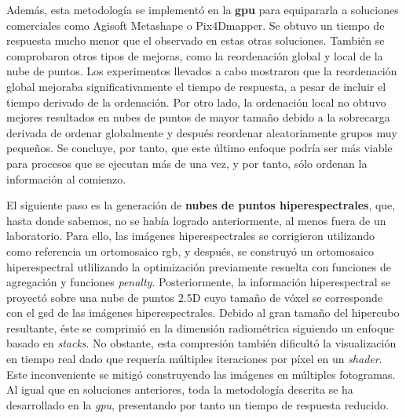 Además, esta metodología se implementó en la \textbf{\acrshort{gpu}} para equipararla a soluciones comerciales como Agisoft Metashape o Pix4Dmapper. Se obtuvo un tiempo de respuesta mucho menor que el observado en estas otras soluciones. También se comprobaron otros tipos de mejoras, como la reordenación global y local de la nube de puntos. Los experimentos llevados a cabo mostraron que la reordenación global mejoraba significativamente el tiempo de respuesta, a pesar de incluir el tiempo derivado de la ordenación. Por otro lado, la ordenación local no obtuvo mejores resultados en nubes de puntos de mayor tamaño debido a la sobrecarga derivada de ordenar globalmente y después reordenar aleatoriamente grupos muy pequeños. Se concluye, por tanto, que este último enfoque podría ser más viable para procesos que se ejecutan más de una vez, y por tanto, sólo ordenan la información al comienzo.

El siguiente paso es la generación de \textbf{nubes de puntos hiperespectrales}, que, hasta donde sabemos, no se había logrado anteriormente, al menos fuera de un laboratorio. Para ello, las imágenes hiperespectrales se corrigieron utilizando como referencia un ortomosaico \acrshort{rgb}, y después, se construyó un ortomosaico hiperespectral utlilizando la optimización previamente resuelta con funciones de agregación y funciones \textit{penalty}. Posteriormente, la información hiperespectral se proyectó sobre una nube de puntos 2.5D cuyo tamaño de vóxel se corresponde con el \acrshort{gsd} de las imágenes hiperespectrales. Debido al gran tamaño del hipercubo resultante, éste se comprimió en la dimensión radiométrica siguiendo un enfoque basado en \textit{stacks}. No obstante, esta compresión también dificultó la visualización en tiempo real dado que requería múltiples iteraciones por píxel en un \textit{shader}. Este inconveniente se mitigó construyendo las imágenes en múltiples fotogramas. Al igual que en soluciones anteriores, toda la metodología descrita se ha desarrollado en la \textit{gpu}, presentando por tanto un tiempo de respuesta reducido.

